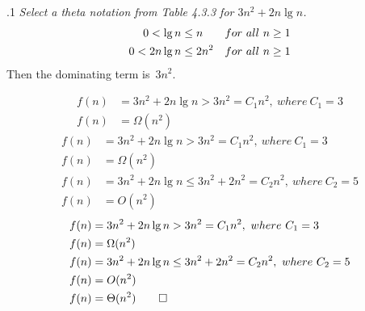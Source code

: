 \documentclass[handout]{beamer}
\begin{document}
        \begin{frame}[c,shrink]{\subsecname{}.1}
            \textit{Select a theta notation from Table 4.3.3 for $3n^2+2n\lg{n}$.}\pause     
            \begin{align*}
                0 < \lg{n}		&\leq n 	\hfill &for\ all\ n \geq 1\\
                0 < 2n\lg{n} 	&\leq 2n^2 \hfill &for\ all\ n \geq 1
            \end{align*}\pause
            Then the dominating term is\ $3n^2$.\\ \pause
            \begin{overprint}
            \begin{align*}
            f(n)&= 3n^2+2n\lg{n} > 3n^2=C_1n^2,\ where\ C_1=3\\
            f(n)&=\Omega(n^2)
            \end{align*}
            \begin{align*}
            f(n)&= 3n^2+2n\lg{n} > 3n^2=C_1n^2,\ where\ C_1=3\\
            f(n)&=\Omega(n^2)\\
            f(n)&= 3n^2+2n\lg{n} \leq 3n^2+2n^2=C_2n^2,\ where\ C_2=5\\
            f(n)&=O(n^2)
            \end{align*}
            \begin{align*}
            f(n)	&= 3n^2+2n\lg{n} > 3n^2=C_1n^2,\ where\ C_1=3\\
            f(n)	&= \Omega(n^2)\\
            f(n)	&= 3n^2+2n\lg{n} \leq 3n^2+2n^2=C_2n^2,\ where\ C_2=5\\
            f(n)	&= O(n^2)\\
            f(n)	&= \Theta(n^2)  \qed
            \end{align*}
            \end{overprint}
        \end{frame}
        
\end{document}
